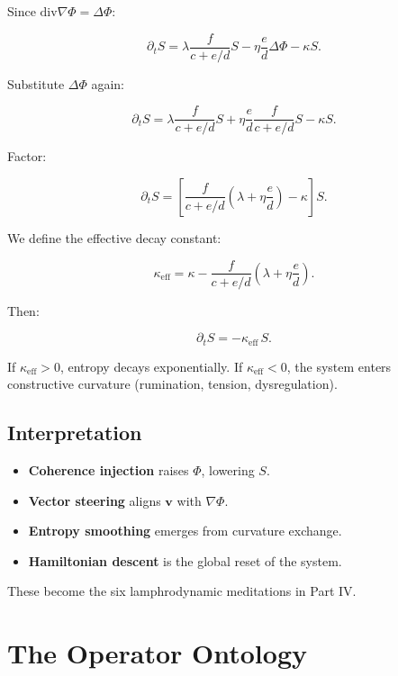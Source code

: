 \documentclass[12pt]{article}
\begin{document}
Since $\mathrm{div}\nabla\Phi = \Delta\Phi$:

\[
\partial_t S
=
\lambda \frac{f}{c+e/d} S
- \eta\frac{e}{d}\Delta\Phi
- \kappa S.
\]

Substitute $\Delta\Phi$ again:

\[
\partial_t S
=
\lambda \frac{f}{c+e/d} S
+ \eta\frac{e}{d}\frac{f}{c+e/d} S
- \kappa S.
\]

Factor:

\[
\partial_t S
=
\left[
\frac{f}{c + e/d}\left(\lambda + \eta\frac{e}{d}\right)
- \kappa
\right] S.
\]

We define the effective decay constant:

\[
\kappa_{\mathrm{eff}}
=
\kappa
-
\frac{f}{c + e/d}\left(\lambda + \eta\frac{e}{d}\right).
\]

Then:

\[
\boxed{
\partial_t S = -\kappa_{\mathrm{eff}}\, S.
}
\]

If $\kappa_{\mathrm{eff}} > 0$, entropy decays exponentially.  
If $\kappa_{\mathrm{eff}} < 0$, the system enters constructive curvature (rumination, tension, dysregulation).

\section{Interpretation}

\begin{itemize}
    \item \textbf{Coherence injection} raises $\Phi$, lowering $S$.
    \item \textbf{Vector steering} aligns $\mathbf{v}$ with $\nabla\Phi$.
    \item \textbf{Entropy smoothing} emerges from curvature exchange.
    \item \textbf{Hamiltonian descent} is the global reset of the system.
\end{itemize}

These become the six lamphrodynamic meditations in Part IV.

\newpage


\chapter{The Operator Ontology}
\end{document}

